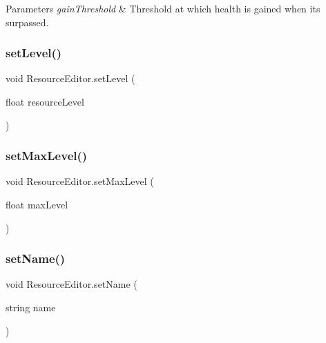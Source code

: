 \begin{DoxyParams}{Parameters}
{\em gain\+Threshold} & Threshold at which health is gained when it\textquotesingle{}s surpassed.\\
\hline
\end{DoxyParams}
\mbox{\label{class_resource_editor_a123d8260cfbc18a439e5e222ec1c101e}} 
\subsubsection{\texorpdfstring{set\+Level()}{setLevel()}}
{\footnotesize\ttfamily void Resource\+Editor.\+set\+Level (\begin{DoxyParamCaption}\item[{float}]{resource\+Level }\end{DoxyParamCaption})}

\mbox{\label{class_resource_editor_ac6807f97759768dfbf00a4517e46907d}} 
\subsubsection{\texorpdfstring{set\+Max\+Level()}{setMaxLevel()}}
{\footnotesize\ttfamily void Resource\+Editor.\+set\+Max\+Level (\begin{DoxyParamCaption}\item[{float}]{max\+Level }\end{DoxyParamCaption})}

\mbox{\label{class_resource_editor_ae0558c83ceec579e083cf02d1a8e698e}} 
\subsubsection{\texorpdfstring{set\+Name()}{setName()}}
{\footnotesize\ttfamily void Resource\+Editor.\+set\+Name (\begin{DoxyParamCaption}\item[{string}]{name }\end{DoxyParamCaption})}



